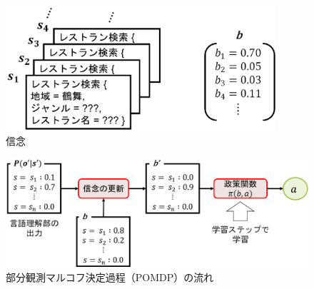\begin{figure}[thb]
  \begin{center}
    \includegraphics[width=10cm]{chapter2/belief.eps}
    \caption{信念}
    \label{fig:belief}
  \end{center}
\end{figure}

\begin{figure}[thb]
  \begin{center}
    \includegraphics[width=15cm]{chapter2/pomdp2.eps}
    \caption{部分観測マルコフ決定過程（POMDP）の流れ}
    \label{fig:pomdp}
  \end{center}
\end{figure}

